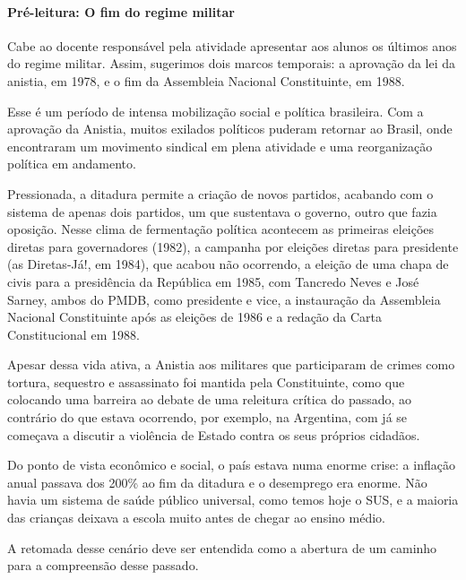 \documentclass[12pt]{extarticle}
\begin{document}
\paragraph{Pré-leitura: O fim do regime militar}

Cabe ao docente responsável pela atividade apresentar aos alunos os
últimos anos do regime militar. Assim, sugerimos dois marcos temporais:
a aprovação da lei da anistia, em 1978, e o fim da Assembleia Nacional
Constituinte, em 1988.

Esse é um período de intensa mobilização social e política brasileira.
Com a aprovação da Anistia, muitos exilados políticos puderam retornar
ao Brasil, onde encontraram um movimento sindical em plena atividade e
uma reorganização política em andamento.

Pressionada, a ditadura permite a criação de novos partidos, acabando
com o sistema de apenas dois partidos, um que sustentava o governo,
outro que fazia oposição. Nesse clima de fermentação política acontecem
as primeiras eleições diretas para governadores (1982), a campanha por
eleições diretas para presidente (as Diretas-Já!, em 1984), que acabou
não ocorrendo, a eleição de uma chapa de civis para a presidência da
República em 1985, com Tancredo Neves e José Sarney, ambos do PMDB, como
presidente e vice, a instauração da Assembleia Nacional Constituinte
após as eleições de 1986 e a redação da Carta Constitucional em 1988.



Apesar dessa vida ativa, a Anistia aos militares que participaram de
crimes como tortura, sequestro e assassinato foi mantida pela
Constituinte, como que colocando uma barreira ao debate de uma releitura
crítica do passado, ao contrário do que estava ocorrendo, por exemplo,
na Argentina, com já se começava a discutir a violência de Estado contra
os seus próprios cidadãos.



Do ponto de vista econômico e social, o país estava numa enorme crise: a
inflação anual passava dos 200\% ao fim da ditadura e o desemprego era
enorme. Não havia um sistema de saúde público universal, como temos hoje
o SUS, e a maioria das crianças deixava a escola muito antes de chegar
ao ensino médio.

A retomada desse cenário deve ser entendida como a abertura de um
caminho para a compreensão desse passado.
\end{document}
